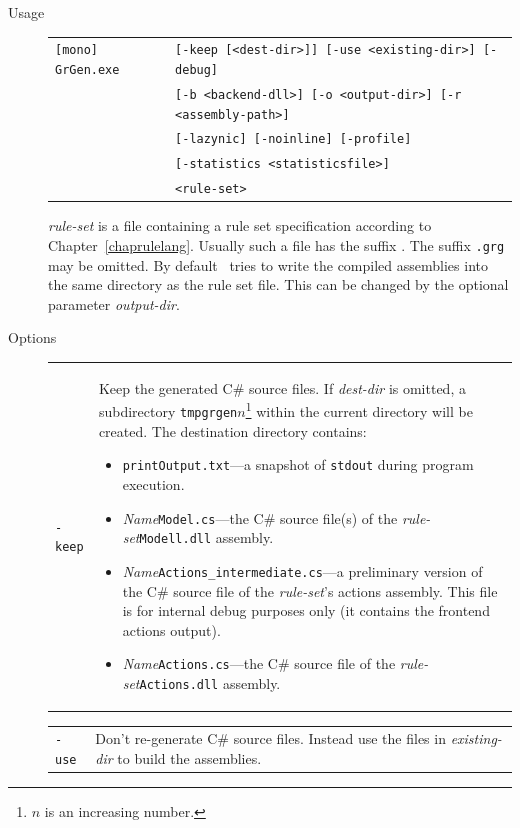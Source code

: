 \begin{description}
  \item[Usage] \begin{tabular*}{\linewidth}{@{}l@{}l}\texttt{[mono] GrGen.exe } & \texttt{[-keep [<dest-dir>]] [-use <existing-dir>] [-debug]}\\
        &\texttt{[-b <backend-dll>] [-o <output-dir>] [-r <assembly-path>]}\\
        &\texttt{[-lazynic] [-noinline] [-profile]}\\
        &\texttt{[-statistics <statisticsfile>]}\\
        &\texttt{<rule-set>}\end{tabular*}
    \emph{rule-set} is a file containing a rule set specification according to Chapter~\ref{chaprulelang}. Usually such a file has the suffix \texttt{}. The suffix \texttt{.grg} may be omitted.
By default \GrG\ tries to write the compiled assemblies into the same directory as the rule set file. This can be changed by the optional parameter \emph{output-dir}.
  \item[Options] \mbox{}
    \begin{tabularx}{\linewidth}{lX}
      \texttt{-keep} & Keep the generated C\# source files. If \emph{dest-dir} is omitted, a subdirectory \texttt{tmpgrgen$n$}\footnote{$n$ is an increasing number.} within the current directory will be created. The destination directory contains:
\begin{itemize}
  \item \texttt{printOutput.txt}---a snapshot of \texttt{stdout} during program execution.
  \item \emph{Name}\texttt{Model.cs}---the C\# source file(s) of the \emph{rule-set}\texttt{Modell.dll} assembly.
  \item \emph{Name}\texttt{Actions\_intermediate.cs}---a preliminary version of the C\# source file of the \emph{rule-set}'s actions assembly.
	This file is for internal debug purposes only (it contains the frontend actions output).
  \item \emph{Name}\texttt{Actions.cs}---the C\# source file of the \emph{rule-set}\texttt{Actions.dll} assembly.
\end{itemize}\\
\end{tabularx}
\begin{tabularx}{\linewidth}{lX}
      \texttt{-use} & Don't re-generate C\# source files. Instead use the files in \emph{existing-dir} to build the assemblies.\\

\end{tabularx}
\end{description}
